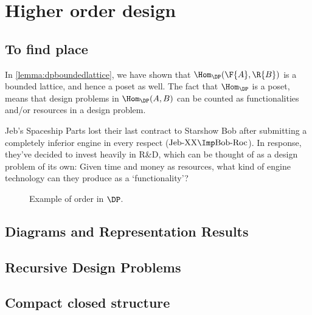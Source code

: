 \section{Higher order design}
\subsection{To find place}
\begin{remark}
In \cref{lemma:dpboundedlattice}, we have shown that $\Hom_{\DP}(\F{A},\R{B})$ is a bounded lattice, and hence a poset as well. The fact that $\Hom_\DP$ is a poset, means that design problems in $\Hom_\DP(A,B)$ can be counted as functionalities and/or resources in a design problem.
\end{remark}

\begin{example}\label{ex:r&d}
Jeb's Spaceship Parts lost their last contract to Starshow Bob after submitting a completely inferior engine in every respect ($\text{Jeb-XX} \Imp \text{Bob-Roc}$). In response, they've decided to invest heavily in R\&D, which can be thought of as a design problem of its own: Given time and money as resources, what kind of engine technology can they produce as a `functionality'?

\begin{figure}[h!]
\begin{center}
\end{center}
\caption{Example of order in $\DP$. \label{fig:orderdp}}
\end{figure}
\end{example}
\subsection{Diagrams and Representation Results}
\todo{}

\subsection{Recursive Design Problems}

\subsection{Compact closed structure}\label{sec:compact_closed}

